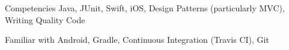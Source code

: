 


\begin{cvskills}


  \cvskill
  {Competencies}
  {Java, JUnit, Swift, iOS, Design Patterns (particularly MVC), Writing Quality Code}


  \cvskill
  {Familiar with}
  {Android, Gradle, Continuous Integration (Travis CI), Git}


\end{cvskills}